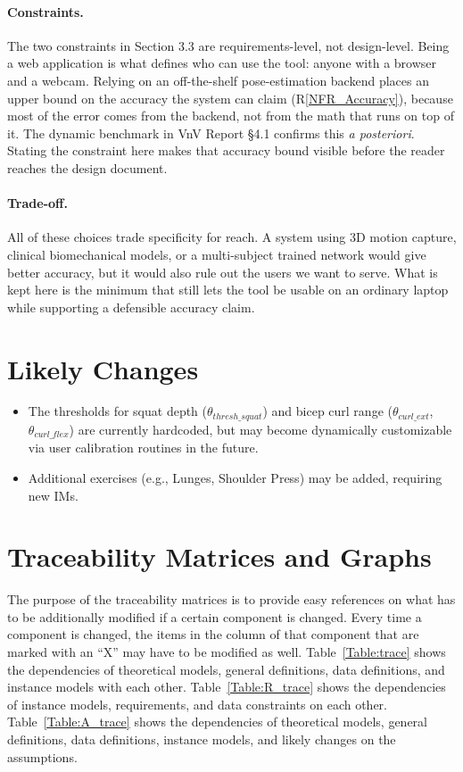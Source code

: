 \documentclass[12pt]{article}
\newcommand{\rref}[1]{R\ref{#1}}
\newcounter{lcnum} %
\begin{document}
\paragraph{Constraints.}
The two constraints in Section 3.3 are requirements-level, not
design-level. Being a web application is what defines who can use the
tool: anyone with a browser and a webcam. Relying on an off-the-shelf
pose-estimation backend places an upper bound on the accuracy the
system can claim (\rref{NFR_Accuracy}), because most of the error
comes from the backend, not from the math that runs on top of it. The
dynamic benchmark in VnV Report \S4.1 confirms this \emph{a
posteriori}. Stating the constraint here makes that accuracy bound
visible before the reader reaches the design document.

\paragraph{Trade-off.}
All of these choices trade specificity for reach. A system using 3D
motion capture, clinical biomechanical models, or a multi-subject
trained network would give better accuracy, but it would also rule out
the users we want to serve. What is kept here is the minimum that
still lets the tool be usable on an ordinary laptop while supporting a
defensible accuracy claim.

\section{Likely Changes}    
\begin{itemize}
\item[LC\refstepcounter{lcnum}\thelcnum:] The thresholds for squat depth ($\theta_{thresh\_squat}$) and bicep curl range ($\theta_{curl\_ext}$, $\theta_{curl\_flex}$) are currently hardcoded, but may become dynamically customizable via user calibration routines in the future.
\item[LC\refstepcounter{lcnum}\thelcnum:] Additional exercises (e.g., Lunges, Shoulder Press) may be added, requiring new IMs.
\end{itemize}

\section{Traceability Matrices and Graphs}

The purpose of the traceability matrices is to provide easy references on what
has to be additionally modified if a certain component is changed.  Every time a
component is changed, the items in the column of that component that are marked
with an ``X'' may have to be modified as well.  Table~\ref{Table:trace} shows the
dependencies of theoretical models, general definitions, data definitions, and
instance models with each other. Table~\ref{Table:R_trace} shows the
dependencies of instance models, requirements, and data constraints on each
other. Table~\ref{Table:A_trace} shows the dependencies of theoretical models,
general definitions, data definitions, instance models, and likely changes on
the assumptions.
\end{document}
